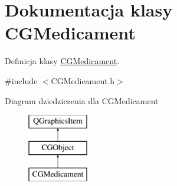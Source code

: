 \hypertarget{class_c_g_medicament}{}\section{Dokumentacja klasy C\+G\+Medicament}
\label{class_c_g_medicament}


Definicja klasy \mbox{\hyperlink{class_c_g_medicament}{C\+G\+Medicament}}.  




{\ttfamily \#include $<$C\+G\+Medicament.\+h$>$}

Diagram dziedziczenia dla C\+G\+Medicament\begin{figure}[H]
\begin{center}
\leavevmode
\includegraphics[height=3.000000cm]{class_c_g_medicament}
\end{center}
\end{figure}
